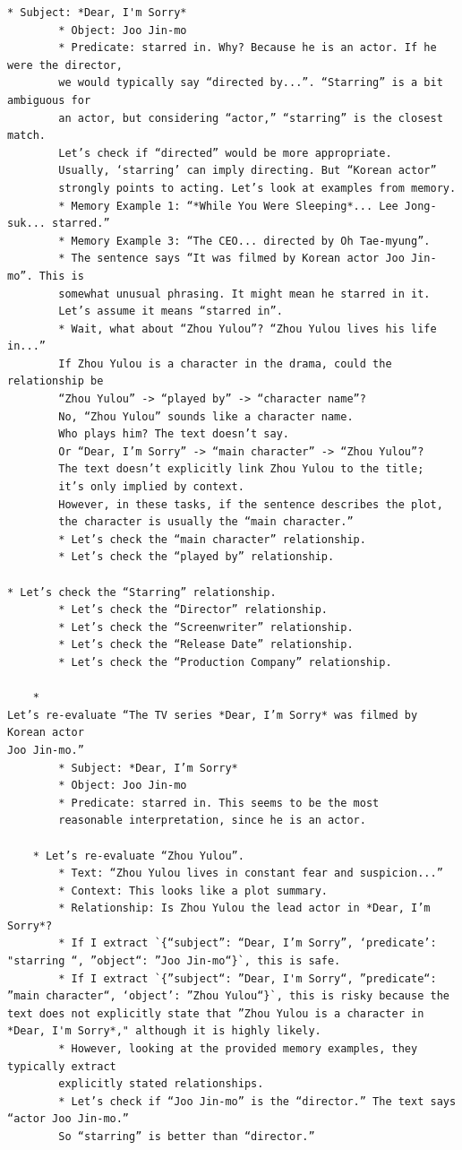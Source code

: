 \begin{verbatim}
* Subject: *Dear, I'm Sorry* 
        * Object: Joo Jin-mo
        * Predicate: starred in. Why? Because he is an actor. If he were the director, 
        we would typically say “directed by...”. “Starring” is a bit ambiguous for 
        an actor, but considering “actor,” “starring” is the closest match. 
        Let’s check if “directed” would be more appropriate. 
        Usually, ‘starring’ can imply directing. But “Korean actor” 
        strongly points to acting. Let’s look at examples from memory.
        * Memory Example 1: “*While You Were Sleeping*... Lee Jong-suk... starred.”
        * Memory Example 3: “The CEO... directed by Oh Tae-myung”.
        * The sentence says “It was filmed by Korean actor Joo Jin-mo”. This is 
        somewhat unusual phrasing. It might mean he starred in it. 
        Let’s assume it means “starred in”.
        * Wait, what about “Zhou Yulou”? “Zhou Yulou lives his life in...” 
        If Zhou Yulou is a character in the drama, could the relationship be 
        “Zhou Yulou” -> “played by” -> “character name”? 
        No, “Zhou Yulou” sounds like a character name. 
        Who plays him? The text doesn’t say. 
        Or “Dear, I’m Sorry” -> “main character” -> “Zhou Yulou”? 
        The text doesn’t explicitly link Zhou Yulou to the title; 
        it’s only implied by context. 
        However, in these tasks, if the sentence describes the plot, 
        the character is usually the “main character.”
        * Let’s check the “main character” relationship.
        * Let’s check the “played by” relationship.
        
* Let’s check the “Starring” relationship.
        * Let’s check the “Director” relationship.
        * Let’s check the “Screenwriter” relationship.
        * Let’s check the “Release Date” relationship.
        * Let’s check the “Production Company” relationship.

    * 
Let’s re-evaluate “The TV series *Dear, I’m Sorry* was filmed by Korean actor 
Joo Jin-mo.”
        * Subject: *Dear, I’m Sorry*
        * Object: Joo Jin-mo
        * Predicate: starred in. This seems to be the most 
        reasonable interpretation, since he is an actor.

    * Let’s re-evaluate “Zhou Yulou”.
        * Text: “Zhou Yulou lives in constant fear and suspicion...”
        * Context: This looks like a plot summary.
        * Relationship: Is Zhou Yulou the lead actor in *Dear, I’m Sorry*?
        * If I extract `{“subject”: “Dear, I’m Sorry”, ‘predicate’: "starring “, ”object“: ”Joo Jin-mo“}`, this is safe.
        * If I extract `{”subject“: ”Dear, I'm Sorry“, ”predicate“: ”main character“, ‘object’: ”Zhou Yulou“}`, this is risky because the text does not explicitly state that ”Zhou Yulou is a character in *Dear, I'm Sorry*," although it is highly likely.
        * However, looking at the provided memory examples, they typically extract 
        explicitly stated relationships.
        * Let’s check if “Joo Jin-mo” is the “director.” The text says “actor Joo Jin-mo.” 
        So “starring” is better than “director.”


\end{verbatim}
